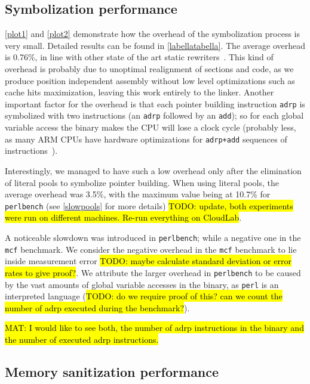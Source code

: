 \documentclass[a4paper,11pt,oneside]{report}
\DeclareRobustCommand{\todo}[1]{{\sethlcolor{cyan}\hl{TODO: #1}}}
\DeclareRobustCommand{\mat}[1]{{\sethlcolor{red}\hl{MAT: #1}}}
\begin{document}
\subsection{Symbolization performance}

\autoref{plot1} and \autoref{plot2} demonstrate how the overhead of the
symbolization process is very small. Detailed results can be found in
\autoref{labellatabella}.  The average overhead is 0.76\%, in line with other
state of the art static rewriters~\cite{egalito}.  This kind of overhead is
probably due to unoptimal realignment of sections and code, as we produce
position independent assembly without low level optimizations such as cache
hits maximization, leaving this work entirely to the linker. Another important
factor for the overhead is that each pointer building instruction \texttt{adrp}
is symbolized with two instructions (an \texttt{adrp} followed by an
\texttt{add}); so for each global variable access the binary makes the CPU will
lose a clock cycle (probably less, as many ARM CPUs have hardware optimizations
for \texttt{adrp+add} sequences of instructions~\cite{pointeroptimizations}).

Interestingly, we managed to have such a low overhead only after the
elimination of literal pools to symbolize pointer building. When using literal
pools, the average overhead was 3.5\%, with the maximum value being at 10.7\%
for \texttt{perlbench} (see \autoref{slowpools} for more details) \todo{update, both experiments were run on different machines. Re-run
everything on CloudLab}. 

A noticeable slowdown was introduced in \texttt{perlbench}; while a negative
one in the \texttt{mcf} benchmark. We consider the negative overhead in the
\texttt{mcf} benchmark to lie inside measurement error \todo{maybe calculate
standard deviation or error rates to give proof?}. We attribute the larger
overhead in \texttt{perlbench} to be caused by the vast amounts of global
variable accesses in the binary, as \texttt{perl} is an interpreted language
(\todo{do we require proof of this?  can we count the number of adrp executed
during the benchmark?}).

\mat{I would like to see both, the number of adrp instructions in the binary and the number of executed adrp instructions.}

\subsection{Memory sanitization performance}
\end{document}
